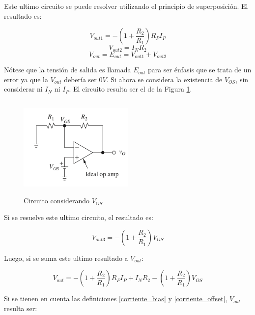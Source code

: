 Este ultimo circuito se puede resolver utilizando el principio de superposición. El resultado es:


\begin{displaymath} V_{out1} = -(1+\frac{R_2}{R_1})R_P I_P \end{displaymath}
\begin{displaymath} V_{out2} = I_N R_2 \end{displaymath}
\begin{displaymath} V_{out} = E_{out} = V_{out1} + V_{out2} \end{displaymath}

Nótese que la tensión de salida es llamada $E_{out}$ para ser énfasis que se trata de un error ya que la $V_{out}$ debería ser $0V$. 
Si ahora se considera la existencia de $V_{OS}$, sin considerar  ni $I_{N}$ ni $I_{P}$. El circuito resulta ser el de la Figura \ref{fig_3}.
 

\begin{figure}[ht]                                                       
    \centering\includegraphics[width=0.5\textwidth, height=5cm]{../Ex3/Figuras/fig_3.png}
    \caption{Circuito considerando $V_{OS}$}
    \label{fig_3}
    \end{figure}


Si se resuelve este ultimo circuito, el resultado es:

\begin{displaymath} V_{out3} = -(1+\frac{R_2}{R_1})V_{OS} \end{displaymath}

Luego, si se suma este ultimo resultado a $V_{out}$:

\begin{equation} V_{out} = -(1+\frac{R_2}{R_1})R_PI_P + I_N R_2 -(1+\frac{R_2}{R_1})V_{OS} \label{V_out_teorico}\end{equation}

Si se tienen en cuenta las definiciones \ref{corriente_bias} y \ref{corriente_offset}, $V_{out}$ resulta ser:

